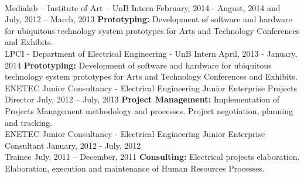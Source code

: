 \documentclass[a4paper]{twentysecondcv} %
\begin{document}
\begin{twenty}
{            \color{pblue}{\hspace{8pt}-\hspace{4pt}} 
        }
        \\
    \twentyitem
    	{Medialab – Institute of Art – UnB}
		{Intern}
		{February, 2014 - August, 2014 and July, 2012 – March, 2013}
        {
            \color{pblue}{\hspace{8pt}-\hspace{4pt}} \color{black}\textbf{Prototyping: }Development of software and hardware for ubiquitous technology system prototypes for Arts and Technology Conferences and Exhibits.
        }
        \\
    \twentyitem
    {LPCI - Department of Electrical Engineering - UnB}
    {Intern}
    {April, 2013 - January, 2014}
    {
        \color{pblue}{\hspace{8pt}-\hspace{4pt}} \color{black}\textbf{Prototyping: }Development of software and hardware for ubiquitous technology system prototypes for Arts and Technology Conferences and Exhibits.
    }
    \\
    \twentyitem
    {ENETEC Junior Consultancy - Electrical Engineering Junior Enterprise}
    {Projects Director}
    {July, 2012 – July, 2013}
    {\color{pblue}{\hspace{8pt}-\hspace{4pt}} \color{black}\textbf{Project Management: }Implementation of Projects Management methodology and processes. Project negotiation, planning and tracking.}
    \\
    \twentyitem
    {ENETEC Junior Consultancy - Electrical Engineering Junior Enterprise}
    {Consultant \hfill January, 2012 - July, 2012\\}
    {Trainee  \hfill July, 2011 – December, 2011}
    {\color{pblue}{\hspace{8pt}-\hspace{4pt}} \color{black}\textbf{Consulting: }Electrical projects elaboration. Elaboration, execution and maintenance of Human Resources Processes.}
\end{twenty}

\end{document}
